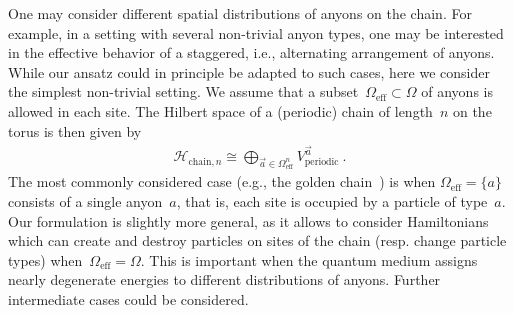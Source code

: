 \documentclass[floats,prb,twocolumn]{revtex4}
\newcommand*{\cH}{\mathcal{H}}
\begin{document}
One may consider different spatial distributions of anyons on the chain. For example, in a setting  with several non-trivial anyon types, one may be interested in the effective behavior of a staggered, i.e., alternating arrangement of anyons. While our ansatz could in principle be adapted to such cases, here we consider the simplest non-trivial setting. We assume that  a subset~$\Omega_{\textrm{eff}}\subset \Omega$ of anyons is allowed in each site. The Hilbert space of a (periodic) chain of length~$n$ on the torus is then given by
  \begin{align}
\cH_{\textrm{chain},n}\cong \bigoplus_{\vec{a}\in\Omega_{\textrm{eff}}^n}V_{\textrm{periodic}}^{\vec{a}}\ .\label{eq:Hilbertspacechain}
\end{align}
The most commonly considered case (e.g., the golden chain~\cite{Feiguinetal07}) is when  $\Omega_{\textrm{eff}}=\{a\}$ consists of a single anyon~$a$, that is, each site is occupied by a particle of type~$a$.  Our formulation is slightly more general, as it allows to consider Hamiltonians which can create and destroy particles on sites of the chain (resp. change particle types) when~$\Omega_{\textrm{eff}}=\Omega$. This is important when the quantum medium assigns nearly degenerate energies to different distributions of anyons. Further intermediate cases could be considered. 

 
\end{document}
